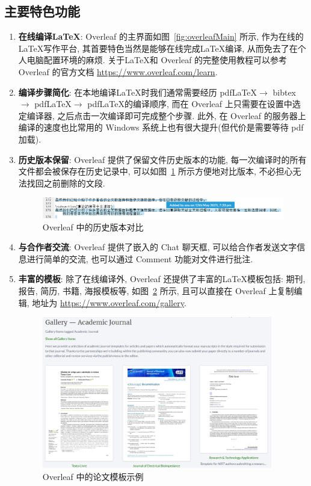 \documentclass{formatBook}
\begin{document}
\subsection{主要特色功能}

\begin{enumerate}
    \item \textbf{在线编译\LaTeX }: Overleaf 的主界面如图~\ref{fig:overleafMain} 所示, 作为在线的\LaTeX 写作平台, 其首要特色当然是能够在线完成\LaTeX 编译, 从而免去了在个人电脑配置环境的麻烦. 关于\LaTeX 和 Overleaf 的完整使用教程可以参考 Overleaf 的官方文档 \url{https://www.overleaf.com/learn}.
    \item \textbf{编译步骤简化}: 在本地编译\LaTeX 时我们通常需要经历 pdf\LaTeX $\rightarrow$ bibtex $\rightarrow$ pdf\LaTeX $\rightarrow$ pdf\LaTeX 的编译顺序, 而在 Overleaf 上只需要在设置中选定编译器, 之后点击一次编译即可完成整个步骤. 此外, 在 Overleaf 的服务器上编译的速度也比常用的 Windows 系统上也有很大提升(但代价是需要等待 pdf 加载).
    \item \textbf{历史版本保留}: Overleaf 提供了保留文件历史版本的功能, 每一次编译时的所有文件都会被保存在历史记录中, 可以如图~\ref{fig:history} 所示方便地对比版本, 不必担心无法找回之前删除的文段.
          \begin{figure}[H]
              \centering
              \includegraphics[width=\textwidth]{figure/history.png}
              \caption{Overleaf 中的历史版本对比}
              \label{fig:history}
          \end{figure}
    \item \textbf{与合作者交流}: Overleaf 提供了嵌入的 Chat 聊天框, 可以给合作者发送文字信息进行简单的交流, 也可以通过 Comment 功能对文件进行批注.
    \item \textbf{丰富的模板}: 除了在线编译外, Overleaf 还提供了丰富的\LaTeX 模板包括: 期刊, 报告, 简历, 书籍, 海报模板等, 如图~\ref{fig:template} 所示, 且可以直接在 Overleaf 上复制编辑, 地址为 \url{https://www.overleaf.com/gallery}.
          \begin{figure}[htbp]
              \centering 
              \includegraphics[width=0.95\textwidth]{figure/template.png}
              \caption{Overleaf 中的论文模板示例}
              \label{fig:template}
          \end{figure}
\end{enumerate}
\end{document}

